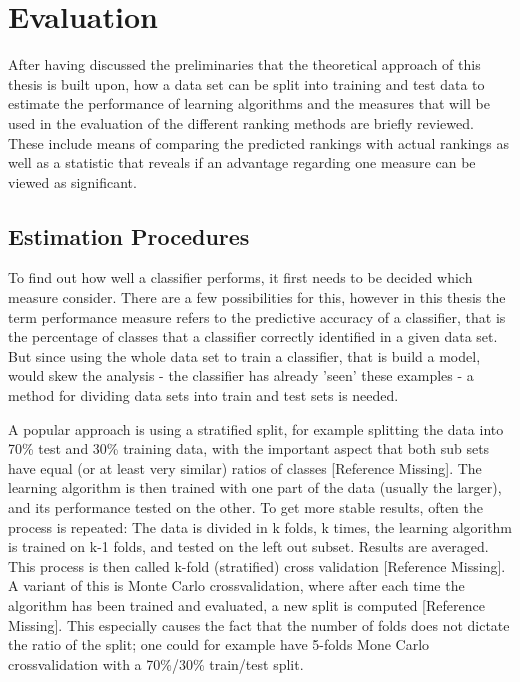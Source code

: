 \section{Evaluation}

After having discussed the preliminaries that the theoretical approach of this thesis is built upon, how a data set can be split into training and test data to estimate the performance of learning algorithms and the measures that will be used in the evaluation of the different ranking methods are briefly reviewed. These include means of comparing the predicted rankings with actual rankings as well as a statistic that reveals if an advantage regarding one measure can be viewed as significant.

\subsection{Estimation Procedures}

To find out how well a classifier performs, it first needs to be decided which measure consider. There are a few possibilities for this, however in this thesis the term performance measure refers to the predictive accuracy of a classifier, that is the percentage of classes that a classifier correctly identified in a given data set. But since using the whole data set to train a classifier, that is build a model, would skew the analysis - the classifier has already 'seen' these examples - a method for dividing data sets into train and test sets is needed. 

A popular approach is using a stratified split, for example splitting the data into 70\% test and 30\% training data, with the important aspect that both sub sets have equal (or at least very similar) ratios of classes [Reference Missing]. The learning algorithm is then trained with one part of the data (usually the larger), and its performance tested on the other. To get more stable results, often the process is repeated: The data is divided in k folds, k times, the learning algorithm is trained on k-1 folds, and tested on the left out subset. Results are averaged. This process is then called k-fold (stratified) cross validation [Reference Missing]. A variant of this is Monte Carlo crossvalidation, where after each time the algorithm has been trained and evaluated, a new split is computed [Reference Missing]. This especially causes the fact that the number of folds does not dictate the ratio of the split; one could for example have 5-folds Mone Carlo crossvalidation with a 70\%/30\% train/test split.

